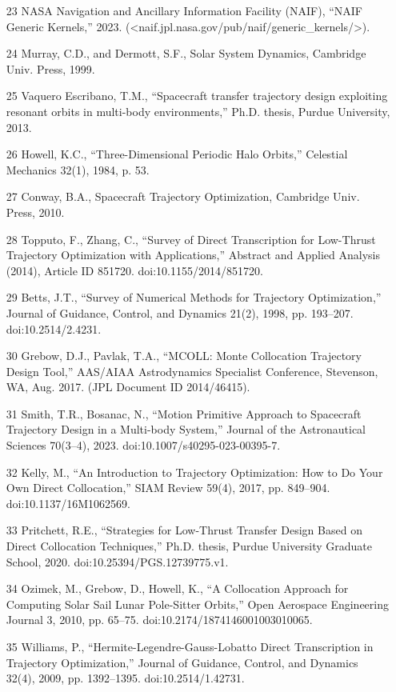 \documentclass[12pt]{article}
\begin{document}
\begin{enumerate}
\item [23] NASA Navigation and Ancillary Information Facility (NAIF), ``NAIF Generic Kernels,'' 2023. (<naif.jpl.nasa.gov/pub/naif/generic_kernels/>).
\item [24] Murray, C.D., and Dermott, S.F., Solar System Dynamics, Cambridge Univ. Press, 1999.
\item [25] Vaquero Escribano, T.M., ``Spacecraft transfer trajectory design exploiting resonant orbits in multi-body environments,'' Ph.D. thesis, Purdue University, 2013.
\item [26] Howell, K.C., ``Three-Dimensional Periodic Halo Orbits,'' Celestial Mechanics 32(1), 1984, p. 53.
\item [27] Conway, B.A., Spacecraft Trajectory Optimization, Cambridge Univ. Press, 2010.
\item [28] Topputo, F., Zhang, C., ``Survey of Direct Transcription for Low-Thrust Trajectory Optimization with Applications,'' Abstract and Applied Analysis (2014), Article ID 851720. doi:10.1155/2014/851720.
\item [29] Betts, J.T., ``Survey of Numerical Methods for Trajectory Optimization,'' Journal of Guidance, Control, and Dynamics 21(2), 1998, pp. 193--207. doi:10.2514/2.4231.
\item [30] Grebow, D.J., Pavlak, T.A., ``MCOLL: Monte Collocation Trajectory Design Tool,'' AAS/AIAA Astrodynamics Specialist Conference, Stevenson, WA, Aug. 2017. (JPL Document ID 2014/46415).
\item [31] Smith, T.R., Bosanac, N., ``Motion Primitive Approach to Spacecraft Trajectory Design in a Multi-body System,'' Journal of the Astronautical Sciences 70(3--4), 2023. doi:10.1007/s40295-023-00395-7.
\item [32] Kelly, M., ``An Introduction to Trajectory Optimization: How to Do Your Own Direct Collocation,'' SIAM Review 59(4), 2017, pp. 849--904. doi:10.1137/16M1062569.
\item [33] Pritchett, R.E., ``Strategies for Low-Thrust Transfer Design Based on Direct Collocation Techniques,'' Ph.D. thesis, Purdue University Graduate School, 2020. doi:10.25394/PGS.12739775.v1.
\item [34] Ozimek, M., Grebow, D., Howell, K., ``A Collocation Approach for Computing Solar Sail Lunar Pole-Sitter Orbits,'' Open Aerospace Engineering Journal 3, 2010, pp. 65--75. doi:10.2174/1874146001003010065.
\item [35] Williams, P., ``Hermite-Legendre-Gauss-Lobatto Direct Transcription in Trajectory Optimization,'' Journal of Guidance, Control, and Dynamics 32(4), 2009, pp. 1392--1395. doi:10.2514/1.42731.

\end{enumerate}
\end{document}
